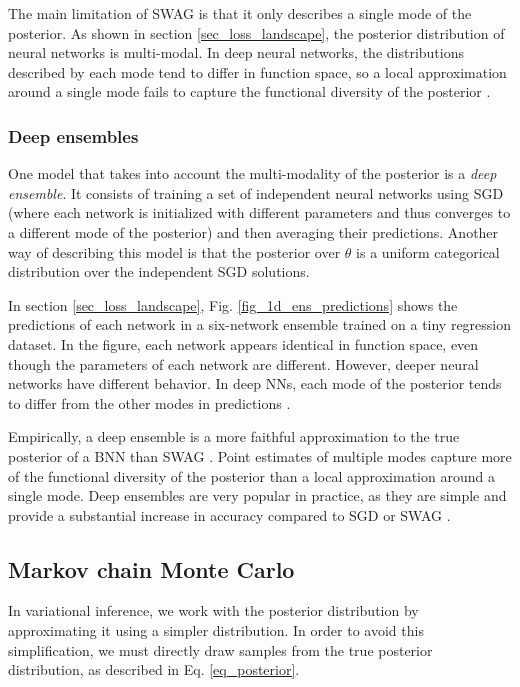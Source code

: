 \documentclass[12pt]{article}
\begin{document}
The main limitation of SWAG is that it only describes a single mode of the posterior. As shown in section \ref{sec_loss_landscape}, the posterior distribution of neural networks is multi-modal. In deep neural networks, the distributions described by each mode tend to differ in function space, so a local approximation around a single mode fails to capture the functional diversity of the posterior \cite{deep_ens, multiswag}.

\subsubsection{Deep ensembles}

One model that takes into account the multi-modality of the posterior is a \textit{deep ensemble}. It consists of training a set of independent neural networks using SGD (where each network is initialized with different parameters and thus converges to a different mode of the posterior) and then averaging their predictions. Another way of describing this model is that the posterior over $\theta$ is a uniform categorical distribution over the independent SGD solutions.

In section \ref{sec_loss_landscape}, Fig. \ref{fig_1d_ens_predictions} shows the predictions of each network in a six-network ensemble trained on a tiny regression dataset. In the figure, each network appears identical in function space, even though the parameters of each network are different. However, deeper neural networks have different behavior. In deep NNs, each mode of the posterior tends to differ from the other modes in predictions \cite{deep_ens}.

Empirically, a deep ensemble is a more faithful approximation to the true posterior of a BNN than SWAG \cite{bnn_posterior}. Point estimates of multiple modes capture more of the functional diversity of the posterior than a local approximation around a single mode. Deep ensembles are very popular in practice, as they are simple and provide a substantial increase in accuracy compared to SGD or SWAG \cite{multiswag}.

\subsection{Markov chain Monte Carlo}
\label{sec_mcmc}

In variational inference, we work with the posterior distribution by approximating it using a simpler distribution. In order to avoid this simplification, we must directly draw samples from the true posterior distribution, as described in Eq. \ref{eq_posterior}.
\end{document}

